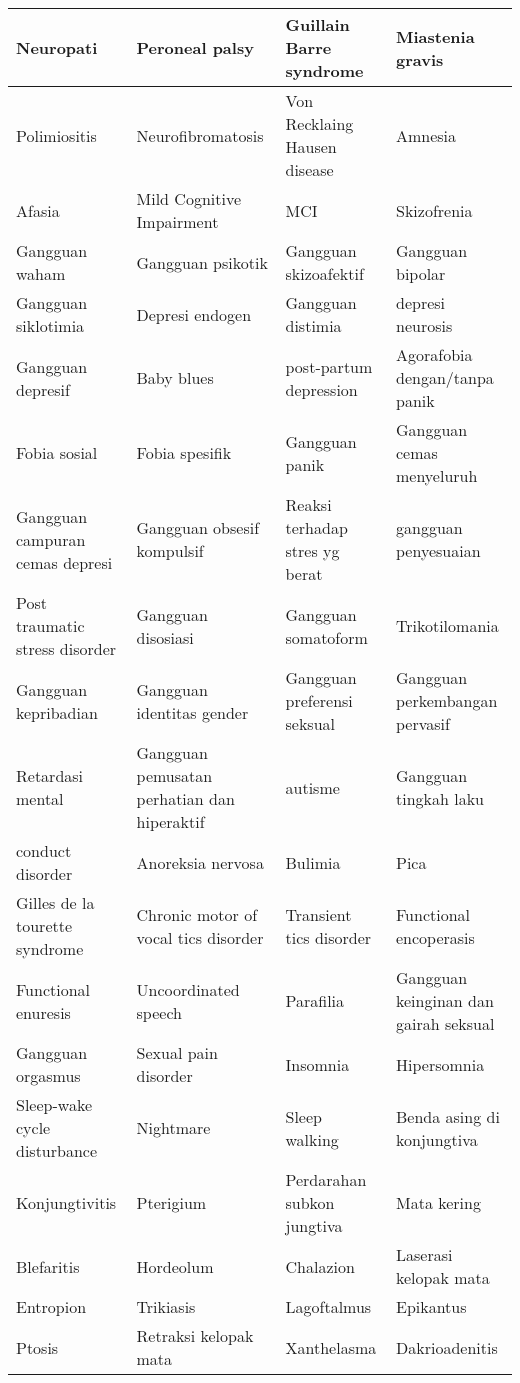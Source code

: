 \begin{longtable}{|p{}|p{}|p{}|p{}|}
	Neuropati & Peroneal palsy & Guillain Barre syndrome & Miastenia gravis \\ \hline
	Polimiositis & Neurofibromatosis & Von Recklaing Hausen disease & Amnesia \\ \hline
	Afasia & Mild Cognitive Impairment & MCI & Skizofrenia \\ \hline
	Gangguan waham & Gangguan psikotik & Gangguan skizoafektif & Gangguan bipolar \\ \hline
	Gangguan siklotimia & Depresi endogen & Gangguan distimia & depresi neurosis \\ \hline
	Gangguan depresif & Baby blues & post-partum depression & Agorafobia dengan/tanpa panik \\ \hline
	Fobia sosial & Fobia spesifik & Gangguan panik & Gangguan cemas menyeluruh \\ \hline
	Gangguan campuran cemas depresi & Gangguan obsesif kompulsif & Reaksi terhadap stres yg berat & gangguan penyesuaian \\ \hline
	Post traumatic stress disorder & Gangguan disosiasi & Gangguan somatoform & Trikotilomania \\ \hline
	Gangguan kepribadian & Gangguan identitas gender & Gangguan preferensi seksual & Gangguan perkembangan pervasif \\ \hline
	Retardasi mental & Gangguan pemusatan perhatian dan hiperaktif & autisme & Gangguan tingkah laku \\ \hline
	conduct disorder & Anoreksia nervosa & Bulimia & Pica \\ \hline
	Gilles de la tourette syndrome & Chronic motor of vocal tics disorder & Transient tics disorder & Functional encoperasis \\ \hline
	Functional enuresis & Uncoordinated speech & Parafilia & Gangguan keinginan dan gairah seksual \\ \hline
	Gangguan orgasmus & Sexual pain disorder & Insomnia & Hipersomnia \\ \hline
	Sleep-wake cycle disturbance & Nightmare & Sleep walking & Benda asing di konjungtiva \\ \hline
	Konjungtivitis & Pterigium & Perdarahan subkon jungtiva & Mata kering \\ \hline
	Blefaritis & Hordeolum & Chalazion & Laserasi kelopak mata \\ \hline
	Entropion & Trikiasis & Lagoftalmus & Epikantus \\ \hline
	Ptosis & Retraksi kelopak mata & Xanthelasma & Dakrioadenitis \\ \hline

\end{longtable}
